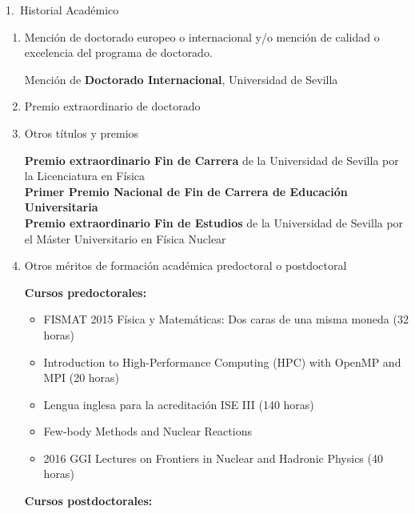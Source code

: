 \documentclass{resume2} %
\begin{document}
\begin{rSection}{1.~Historial Acad\'emico}
\begin{enumerate}[label=\alph*.]
{\bf Universidad de Sevilla}\hfill{29/10/2018}\\
{\em A Transfer to the Continuum formalism for the study of $(p, pn)$ and $(p, 2p)$ reactions on unstable nuclei} \\
\url{https://idus.us.es/items/9ad79a6e-e3d9-48bc-9fbd-bbf940ab3b1d}\\
Calificaci\'on: Cum Laude 10/10\\


\item Menci\'on de doctorado europeo o internacional y/o menci\'on de calidad o excelencia del programa de doctorado.

Mención de \textbf{Doctorado Internacional}, Universidad de Sevilla

\item Premio extraordinario de doctorado

\item Otros t\'itulos y premios

\textbf{Premio extraordinario Fin de Carrera} de la Universidad de Sevilla por la Licenciatura en F\'isica\\

\textbf{Primer Premio Nacional de Fin de Carrera de Educaci\'on Universitaria} \\

\textbf{Premio extraordinario Fin de Estudios} de la Universidad de Sevilla por el M\'aster Universitario en F\'isica Nuclear 

\item Otros méritos de formación acad\'emica predoctoral o postdoctoral

{\sc \bf Cursos predoctorales:}
\begin{itemize}
\item FISMAT 2015 F\'isica y Matem\'aticas: Dos caras de una misma moneda (32 horas)
\item Introduction to High-Performance Computing (HPC) with OpenMP and MPI
(20 horas)
\item Lengua inglesa para la acreditación ISE III (140 horas)
\item Few-body Methods and Nuclear Reactions
\item 2016 GGI Lectures on Frontiers in Nuclear and Hadronic Physics (40 horas)

\end{itemize}

{\sc \bf Cursos postdoctorales:}

\end{enumerate}

\end{rSection}
\end{document}
